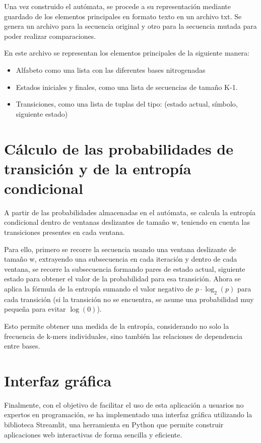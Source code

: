 \documentclass[11pt,spanish,listoffigures,listoftables]{tfgetsinf}
\begin{document}
Una vez construido el autómata, se procede a su representación mediante guardado de los elementos principales en formato texto en un archivo txt. Se genera un archivo para la secuencia original y otro para la secuencia mutada para poder realizar comparaciones. 

En este archivo se representan los elementos principales de la siguiente manera: 

\begin{itemize}
   \item Alfabeto como una lista con las diferentes bases nitrogenadas 
   \item Estados iniciales y finales, como una lista de secuencias de tamaño K-1.
   \item Transiciones, como una lista de tuplas del tipo: (estado actual, símbolo, siguiente estado)
\end{itemize}


\section{Cálculo de las probabilidades de transición y de la entropía condicional}

A partir de las probabilidades almacenadas en el autómata, se calcula la entropía condicional dentro de ventanas deslizantes de tamaño w, teniendo en cuenta las transiciones presentes en cada ventana. 

Para ello, primero se recorre la secuencia usando una ventana deslizante de tamaño w, extrayendo una subsecuencia en cada iteración y dentro de cada ventana, se recorre la subsecuencia formando pares de estado actual, siguiente estado para obtener el valor de la probabilidad para esa transición. Ahora se aplica la fórmula de la entropía sumando el valor negativo de $p \cdot \log_2(p)$ para cada transición (si la transición no se encuentra, se asume una probabilidad muy pequeña para evitar $\log(0)$).


Esto permite obtener una medida de la entropía, considerando no solo la frecuencia de k-mers individuales, sino también las relaciones de dependencia entre bases. 

\section{Interfaz gráfica}

Finalmente, con el objetivo de facilitar el uso de esta aplicación a usuarios no expertos en programación, se ha implementado una interfaz gráfica utilizando la biblioteca Streamlit, una herramienta en Python que permite construir aplicaciones web interactivas de forma sencilla y eficiente. 
\end{document}
